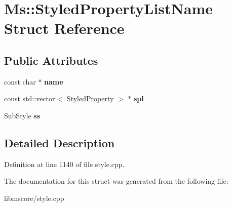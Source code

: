 \hypertarget{struct_ms_1_1_styled_property_list_name}{}\section{Ms\+:\+:Styled\+Property\+List\+Name Struct Reference}
\label{struct_ms_1_1_styled_property_list_name}
\subsection*{Public Attributes}
\begin{DoxyCompactItemize}
\item 
\mbox{\label{struct_ms_1_1_styled_property_list_name_a0b9873b23fa487a606f012a5472ac47c}} 
const char $\ast$ {\bfseries name}
\item 
\mbox{\label{struct_ms_1_1_styled_property_list_name_a9a5f60221e078b391aba648e8909bd10}} 
const std\+::vector$<$ \hyperlink{struct_ms_1_1_styled_property}{Styled\+Property} $>$ $\ast$ {\bfseries spl}
\item 
\mbox{\label{struct_ms_1_1_styled_property_list_name_ad6b8a2886e4c8bc0b5884113ebe088fe}} 
Sub\+Style {\bfseries ss}
\end{DoxyCompactItemize}


\subsection{Detailed Description}


Definition at line 1140 of file style.\+cpp.



The documentation for this struct was generated from the following file\+:\begin{DoxyCompactItemize}
\item 
libmscore/style.\+cpp\end{DoxyCompactItemize}
